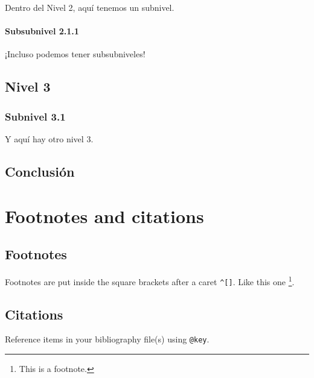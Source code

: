\documentclass[
]{book}
\theoremstyle{definition}
\theoremstyle{definition}
\theoremstyle{definition}
\theoremstyle{definition}
\theoremstyle{remark}
\begin{document}
Dentro del Nivel 2, aquí tenemos un subnivel.

\hypertarget{subsubnivel-2.1.1}{%
\subsubsection*{Subsubnivel 2.1.1}\label{subsubnivel-2.1.1}}

¡Incluso podemos tener subsubniveles!

\hypertarget{nivel-3}{%
\section*{Nivel 3}\label{nivel-3}}

\hypertarget{subnivel-3.1}{%
\subsection*{Subnivel 3.1}\label{subnivel-3.1}}

Y aquí hay otro nivel 3.

\hypertarget{conclusiuxf3n}{%
\section*{Conclusión}\label{conclusiuxf3n}}

\hypertarget{footnotes-and-citations}{%
\chapter{Footnotes and citations}\label{footnotes-and-citations}}

\hypertarget{footnotes}{%
\section{Footnotes}\label{footnotes}}

Footnotes are put inside the square brackets after a caret \texttt{\^{}{[}{]}}. Like this one \footnote{This is a footnote.}.

\hypertarget{citations}{%
\section{Citations}\label{citations}}

Reference items in your bibliography file(s) using \texttt{@key}.
\end{document}
